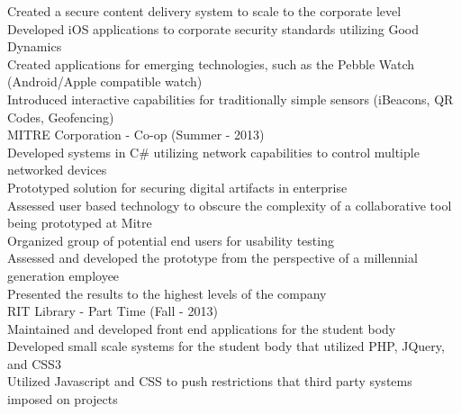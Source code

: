 \documentclass{article}
\begin{document}
Created a secure content delivery system to scale to the corporate level \\
Developed iOS applications to corporate security standards utilizing Good Dynamics \\
Created applications for emerging technologies, such as the Pebble Watch (Android/Apple compatible watch) \\
Introduced interactive capabilities for traditionally simple sensors (iBeacons, QR Codes, Geofencing) \\
{\large MITRE Corporation - Co-op (Summer - 2013) } \\
Developed systems in C\# utilizing network capabilities to control multiple networked devices \\
Prototyped solution for securing digital artifacts in enterprise \\
Assessed user based technology to obscure the complexity of a collaborative tool being prototyped at Mitre \\
Organized group of potential end users for usability testing \\
Assessed and developed the prototype from the perspective of a millennial generation employee \\
Presented the results to the highest levels of the company \\
{\large RIT Library - Part Time (Fall - 2013) } \\
Maintained and developed front end applications for the student body \\
Developed small scale systems for the student body that utilized PHP, JQuery, and CSS3 \\
Utilized Javascript and CSS to push restrictions that third party systems imposed on projects \\
\end{document}
